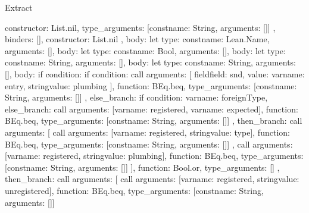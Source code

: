 \begin{lexlean}{Extract}
\begin{toolingmodule}
{{{{{              constructor: List.nil,
              type_arguments: [const{name: String, arguments: []}]
            },
            binders: [],
            constructor: List.nil
          },
          {
            body: let{
              type: const{name: Lean.Name, arguments: []},
              body: let{
                type: const{name: Bool, arguments: []},
                body: let{
                  type: const{name: String, arguments: []},
                  body: let{
                    type: const{name: String, arguments: []},
                    body: if{
                      condition: if{
                        condition: call{
                          arguments: [
                            field{field: snd, value: var{name: entry}},
                            string{value: plumbing}
                          ],
                          function: BEq.beq,
                          type_arguments: [const{name: String, arguments: []}]
                        },
                        else_branch: if{
                          condition: var{name: foreignType},
                          else_branch: call{
                            arguments: [var{name: registered}, var{name: expected}],
                            function: BEq.beq,
                            type_arguments: [const{name: String, arguments: []}]
                          },
                          then_branch: call{
                            arguments: [
                              call{
                                arguments: [var{name: registered}, string{value: type}],
                                function: BEq.beq,
                                type_arguments: [const{name: String, arguments: []}]
                              },
                              call{
                                arguments: [var{name: registered}, string{value: plumbing}],
                                function: BEq.beq,
                                type_arguments: [const{name: String, arguments: []}]
                              }
                            ],
                            function: Bool.or,
                            type_arguments: []
                          }
                        },
                        then_branch: call{
                          arguments: [
                            call{
                              arguments: [var{name: registered}, string{value: unregistered}],
                              function: BEq.beq,
                              type_arguments: [const{name: String, arguments: []}]
                            }
}}}}}}}}}}}
\end{toolingmodule}
\end{lexlean}
